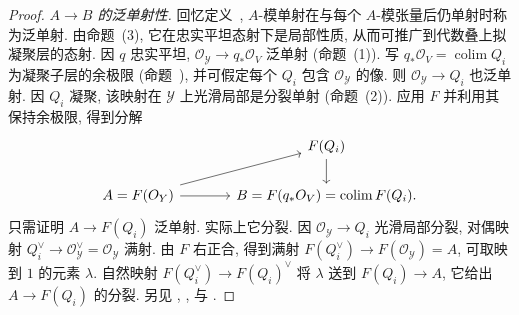 \begin{proof}
\emph{$A\to B$ 的泛单射性.} 回忆定义~, $A$-模单射在与每个 $A$-模张量后仍单射时称为泛单射. 由命题~(3), 它在忠实平坦态射下是局部性质, 从而可推广到代数叠上拟凝聚层的态射. 因 $q$ 忠实平坦, $\mathcal O_{\mathcal Y}\to q_*\mathcal O_V$ 泛单射 (命题~(1)). 写 $q_*\mathcal O_V=\operatorname{colim}Q_i$ 为凝聚子层的余极限 (命题~), 并可假定每个 $Q_i$ 包含 $\mathcal O_{\mathcal Y}$ 的像. 则 $\mathcal O_{\mathcal Y}\to Q_i$ 也泛单射. 因 $Q_i$ 凝聚, 该映射在 $\mathcal Y$ 上光滑局部是分裂单射 (命题~(2)). 应用 $F$ 并利用其保持余极限, 得到分解
\begin{align*}
\begin{tikzcd}[ampersand replacement=\&,column sep=large]
\&F(Q_i)\arrow[d]\\
A=F(\mathcal O_{\mathcal Y})\arrow[ur]\arrow[r]\&B=F(q_*\mathcal O_V)=\operatorname{colim}F(Q_i).
\end{tikzcd}
\end{align*}
只需证明 $A\to F(Q_i)$ 泛单射. 实际上它分裂. 因 $\mathcal O_{\mathcal Y}\to Q_i$ 光滑局部分裂, 对偶映射 $Q_i^\vee\to\mathcal O_{\mathcal Y}^\vee=\mathcal O_{\mathcal Y}$ 满射. 由 $F$ 右正合, 得到满射 $F(Q_i^\vee)\to F(\mathcal O_{\mathcal Y})=A$, 可取映到 $1$ 的元素 $\lambda$. 自然映射 $F(Q_i^\vee)\to F(Q_i)^\vee$ 将 $\lambda$ 送到 $F(Q_i)\to A$, 它给出 $A\to F(Q_i)$ 的分裂. 另见 \cite{Lur04}, \cite{HR19b}, \cite{BHL17} 与 \cite[Tag 0GRR]{SP}.
\end{proof}
